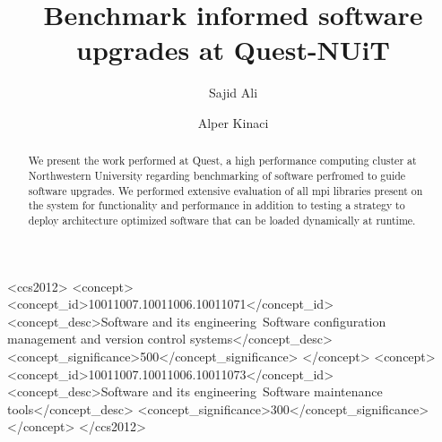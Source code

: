 \documentclass[sigconf,authordraft]{acmart}
\begin{document}
\title{Benchmark informed software upgrades at Quest-NUiT}

\author{Sajid Ali}

\author{Alper Kinaci}


\begin{abstract}
  We present the work performed at Quest, a high performance computing cluster at Northwestern University regarding benchmarking of software perfromed to guide software upgrades. We performed extensive evaluation of all mpi libraries present on the system for functionality and performance in addition to testing a strategy to deploy architecture optimized software that can be loaded dynamically at runtime.
\end{abstract}

\begin{CCSXML}
	<ccs2012>
	<concept>
	<concept_id>10011007.10011006.10011071</concept_id>
	<concept_desc>Software and its engineering~Software configuration management and version control systems</concept_desc>
	<concept_significance>500</concept_significance>
	</concept>
	<concept>
	<concept_id>10011007.10011006.10011073</concept_id>
	<concept_desc>Software and its engineering~Software maintenance tools</concept_desc>
	<concept_significance>300</concept_significance>
	</concept>
	</ccs2012>
\end{CCSXML}
\end{document}
